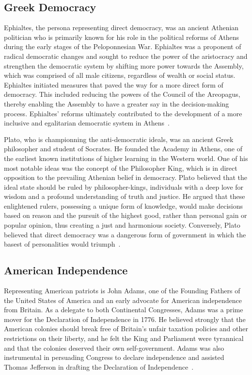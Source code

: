 \documentclass[jair,twoside,11pt,theapa]{article}
\begin{document}
\subsection{Greek Democracy}
Ephialtes, the persona representing direct democracy, was an ancient Athenian politician who is primarily known for his role in the political reforms of Athens during the early stages of the Peloponnesian War.  Ephialtes was a proponent of radical democratic changes and sought to reduce the power of the aristocracy and strengthen the democratic system by shifting more power towards the Assembly, which was comprised of all male citizens, regardless of wealth or social status. Ephialtes initiated measures that paved the way for a more direct form of democracy. This included reducing the powers of the Council of the Areopagus, thereby enabling the Assembly to have a greater say in the decision-making process. Ephialtes' reforms ultimately contributed to the development of a more inclusive and egalitarian democratic system in Athens~.

Plato, who is championning the anti-democratic ideals, was an ancient Greek philosopher and student of Socrates. He founded the Academy in Athens, one of the earliest known institutions of higher learning in the Western world. One of his most notable ideas was the concept of the Philosopher King, which is in direct opposition to the prevailing Athenian belief in democracy.  Plato believed that the ideal state should be ruled by philosopher-kings, individuals with a deep love for wisdom and a profound understanding of truth and justice. He argued that these enlightened rulers, possessing a unique form of knowledge, would make decisions based on reason and the pursuit of the highest good, rather than personal gain or popular opinion, thus creating a just and harmonious society.  Conversely, Plato believed that direct democracy was a dangerous form of government in which the basest of personalities would triumph~.

\subsection{American Independence}
Representing American patriots is John Adams, one of the Founding Fathers of the United States of America and an early advocate for American independence from Britain.  As a delegate to both Continental Congresses, Adams was a prime mover for the Declaration of Independence in 1776. He believed strongly that the American colonies should break free of Britain's unfair taxation policies and other restrictions on their liberty, and he felt the King and Parliament were tyrannical and that the colonies deserved their own self-government.  Adams was also instrumental in persuading Congress to declare independence and assisted Thomas Jefferson in drafting the Declaration of Independence~.
\end{document}
